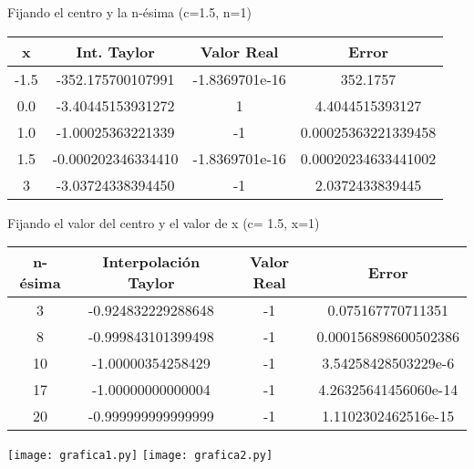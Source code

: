 \documentclass{beamer}
\begin{document}
\begin{frame}
	Fijando el centro y la n-ésima (c=1.5, n=1)\
    \begin{center}
	\begin{tabular}{||c|c|c|c||}
	\hline
    \hline
	x & Int. Taylor & Valor Real & Error \\
	\hline
	-1.5 & -352.175700107991 & -1.8369701e-16 & 352.1757 \\
	\hline
	0.0 & -3.40445153931272 & 1 & 4.4044515393127 \\
	\hline
	1.0 & -1.00025363221339 & -1 & 0.00025363221339458\\	
	\hline
    1.5 & -0.000202346334410 & -1.8369701e-16 & 0.00020234633441002\\
    \hline
    3 & -3.03724338394450 & -1 & 2.0372433839445\\
    \hline
    \hline
	\end{tabular}
    \end{center}
\end{frame}
\begin{frame}
	Fijando el valor del centro y el valor de x (c= 1.5, x=1)
	\begin{center}
	\begin{tabular}{||c|c|c|c||}
	\hline
    \hline
	n-ésima & Interpolación Taylor & Valor Real & Error \\
    \hline
	3 & -0.924832229288648 & -1 & 0.075167770711351\\
	\hline
    8 & -0.999843101399498 & -1 & 0.000156898600502386\\
    \hline
    10 & -1.00000354258429 & -1 & 3.54258428503229e-6 \\
    \hline
    17 & -1.00000000000004 & -1 & 4.26325641456060e-14\\
	\hline
	20 & -0.999999999999999 & -1 & 1.1102302462516e-15\\	
	\hline
    \hline
	\end{tabular}
	\end{center}
\end{frame}
\begin{frame}

 \texttt{[image: grafica1.py]}
  \hspace*{7.5cm}
  \texttt{[image: grafica2.py]}
\end{frame}
\end{document}
